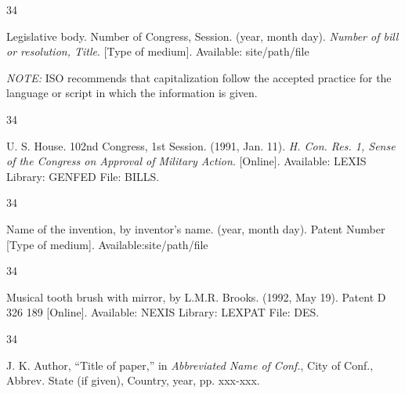 \documentclass{IEEEjmw}
\begin{document}
\vspace*{-12pt}
\begin{thebibliography}{34}
\item[]\hskip-18pt Legislative body. Number of Congress, Session. (year, month day). {\em Number of bill or resolution, Title}. [Type of medium]. Available: site/path/file

\item[]\hskip-18pt {\em NOTE:} ISO recommends that capitalization follow the accepted practice for the language or script in which the information is given.
\end{thebibliography}\vspace*{-11pt}

\vspace*{-12pt}

\begin{thebibliography}{34}
\setcounter{enumiv}{19}

\bibitem{}U. S. House. 102nd Congress, 1st Session. (1991, Jan. 11). {\em H. Con. Res. 1, Sense of the Congress on Approval of Military Action}. [Online]. Available: LEXIS Library: GENFED File: BILLS. 
\end{thebibliography}\vskip-13pt

\vspace*{-12pt}
\begin{thebibliography}{34}
\item[]\hskip-18pt Name of the invention, by inventor's name. (year, month day). Patent Number [Type of medium]. Available:site/path/file
\end{thebibliography}\vspace*{-11pt}


\vspace*{-12pt}

\begin{thebibliography}{34}
\setcounter{enumiv}{20}

\bibitem{}Musical tooth brush with mirror, by L.M.R. Brooks. (1992, May 19). Patent D 326 189
[Online]. Available: NEXIS Library: LEXPAT File:   DES. 
\end{thebibliography}\vspace*{-3pt}


\vspace*{-12pt}
\begin{thebibliography}{34}
\item[]\hskip-18pt J. K. Author, ``Title of paper,'' in {\em Abbreviated Name of Conf.}, City of Conf., Abbrev. State (if given), Country, year, pp. xxx-\break xxx.
\end{thebibliography}{\vfill\pagebreak}
\end{document}
